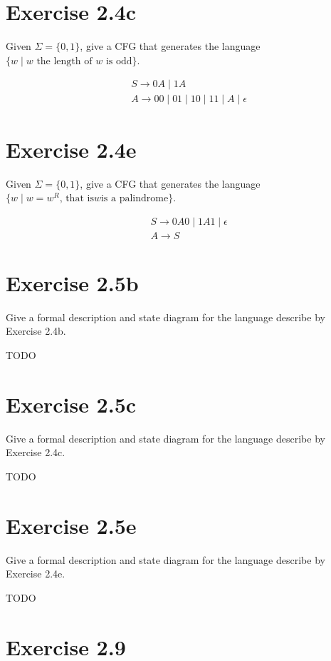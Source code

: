 \documentclass{article}
\newcommand{\where}{\mid}
\begin{document}
\section{Exercise 2.4c}

Given $\Sigma = \{0, 1\}$, give a CFG that generates the language $\{ w \where
w \text{ the length of } w \text{ is odd} \}$.

\begin{align*}
	&S \rightarrow 0A \mid 1A\\
	&A \rightarrow 00 \mid 01 \mid 10 \mid 11 \mid A \mid \epsilon
\end{align*}

\section{Exercise 2.4e}

Given $\Sigma = \{0, 1\}$, give a CFG that generates the language $\{ w \where
w = w^R \text{, that is} w \text{is a palindrome} \}$.

\begin{align*}
	&S \rightarrow 0A0 \mid 1A1 \mid \epsilon\\
	&A \rightarrow S
\end{align*}

\section{Exercise 2.5b}

Give a formal description and state diagram for the language describe by
Exercise 2.4b.

TODO

\section{Exercise 2.5c}

Give a formal description and state diagram for the language describe by
Exercise 2.4c.

TODO

\section{Exercise 2.5e}

Give a formal description and state diagram for the language describe by
Exercise 2.4e.

TODO

\section{Exercise 2.9}
\end{document}
